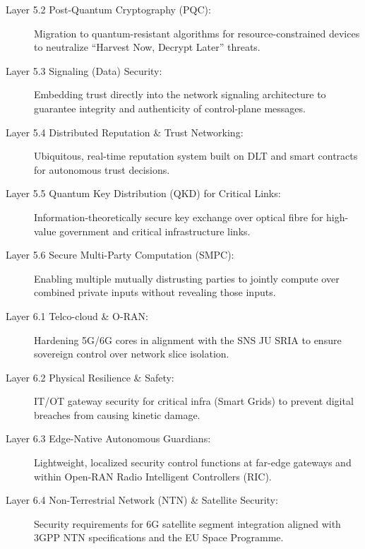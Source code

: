 \documentclass[12pt,a4paper]{report}
\begin{document}
\begin{description}
    \item[Layer 5.2 Post-Quantum Cryptography (PQC):] Migration to quantum-resistant algorithms for resource-constrained devices to neutralize ``Harvest Now, Decrypt Later'' threats.
    \item[Layer 5.3 Signaling (Data) Security:] Embedding trust directly into the network signaling architecture to guarantee integrity and authenticity of control-plane messages.
    \item[Layer 5.4 Distributed Reputation \& Trust Networking:] Ubiquitous, real-time reputation system built on DLT and smart contracts for autonomous trust decisions.
    \item[Layer 5.5 Quantum Key Distribution (QKD) for Critical Links:] Information-theoretically secure key exchange over optical fibre for high-value government and critical infrastructure links.
    \item[Layer 5.6 Secure Multi-Party Computation (SMPC):] Enabling multiple mutually distrusting parties to jointly compute over combined private inputs without revealing those inputs.
    \item[Layer 6.1 Telco-cloud \& O-RAN:] Hardening 5G/6G cores in alignment with the SNS JU SRIA to ensure sovereign control over network slice isolation.
    \item[Layer 6.2 Physical Resilience \& Safety:] IT/OT gateway security for critical infra (Smart Grids) to prevent digital breaches from causing kinetic damage.
    \item[Layer 6.3 Edge-Native Autonomous Guardians:] Lightweight, localized security control functions at far-edge gateways and within Open-RAN Radio Intelligent Controllers (RIC).
    \item[Layer 6.4 Non-Terrestrial Network (NTN) \& Satellite Security:] Security requirements for 6G satellite segment integration aligned with 3GPP NTN specifications and the EU Space Programme.
\end{description}
\end{document}
